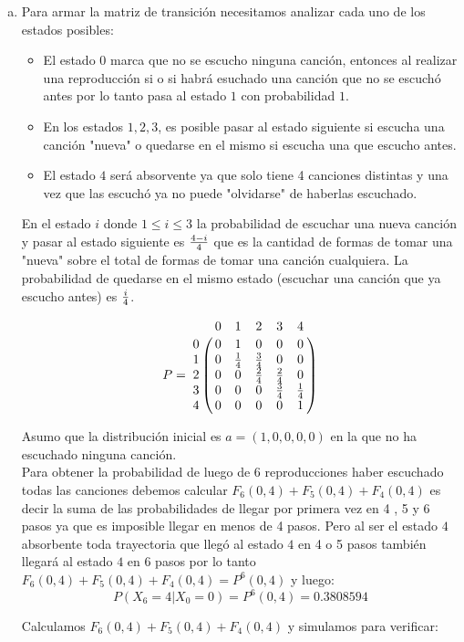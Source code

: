 \documentclass{article}
\begin{document}
\begin{enumerate}[(a)]
\item 

Para armar la matriz de transición necesitamos analizar cada uno de los estados posibles:

\begin{itemize}
    \item El estado $0$ marca que no se escucho ninguna canción, entonces al realizar una reproducción si o si habrá esuchado una canción que no se escuchó antes por lo tanto pasa al estado $1$ con probabilidad $1$.
    \item En los estados $1,2,3$, es posible pasar al estado siguiente si escucha una canción "nueva" o quedarse en el mismo si escucha una que escucho antes.
    \item El estado $4$ será absorvente ya que solo tiene 4 canciones distintas y una vez que las escuchó ya no puede "olvidarse" de haberlas escuchado.
\end{itemize}

En el estado $i$ donde  $ 1 \leq i \leq 3$ la probabilidad de escuchar una nueva canción y pasar al estado siguiente es ${4-i\over 4}$ que es la cantidad de formas de tomar una "nueva" sobre el total de formas de tomar una canción cualquiera. La probabilidad de quedarse en el mismo estado (escuchar una canción que ya escucho antes) es ${i\over 4}$. 




$$P = \bordermatrix{\text{ } & 0 & 1 & 2 & 3 & 4\cr
                0& 0 &  1  & 0 & 0 & 0\cr
                1& 0 &  {1\over 4}  & {3\over 4} & 0 & 0\cr
                2& 0 &  0  & {2\over 4} & {2\over 4} & 0\cr
                3& 0 &  0  & 0 & {3\over 4} & {1\over 4}\cr
                4& 0 &  0  & 0 & 0 & 1}$$


Asumo que la distribución inicial es $a = (1,0,0,0,0)$ en la que no ha escuchado ninguna canción. \\

Para obtener la probabilidad de luego de 6 reproducciones haber escuchado todas las canciones debemos calcular $F_{6}(0,4) + F_{5}(0,4) + F_{4}(0,4) $ es decir la suma de las probabilidades de llegar por primera vez en 4 , 5 y 6 pasos ya que es imposible llegar en menos de 4 pasos. Pero al ser el estado $4$ absorbente toda trayectoria que llegó al estado $4$ en 4 o 5 pasos también llegará al estado $4$ en 6 pasos por lo tanto  $F_{6}(0,4) + F_{5}(0,4) + F_{4}(0,4) = P^6(0,4)$ y luego: $$ P(X_6 = 4 | X_0 = 0) = P^6(0,4) = 0.3808594$$

Calculamos $F_{6}(0,4) + F_{5}(0,4) + F_{4}(0,4)$ y simulamos para verificar:



\end{enumerate}
\end{document}
